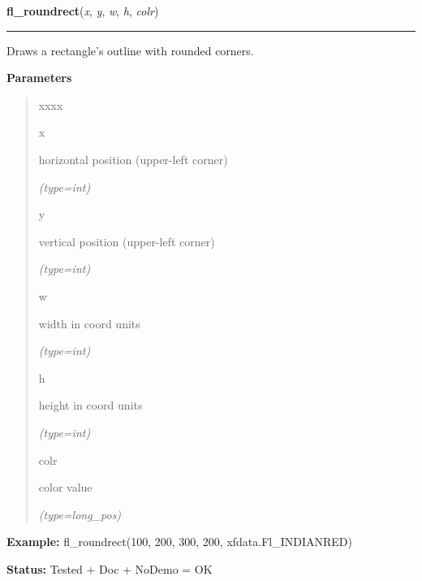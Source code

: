    \label{xformslib:flxbasic:fl_roundrect}

    \vspace{0.5ex}

\hspace{.8\funcindent}\begin{boxedminipage}{\funcwidth}

    \raggedright \textbf{fl\_roundrect}(\textit{x}, \textit{y}, \textit{w}, \textit{h}, \textit{colr})

    \vspace{-1.5ex}

    \rule{\textwidth}{0.5\fboxrule}
\setlength{\parskip}{2ex}
    Draws a rectangle's outline with rounded corners.

\setlength{\parskip}{1ex}
      \textbf{Parameters}
      \vspace{-1ex}

      \begin{quote}
        \begin{Ventry}{xxxx}

          \item[x]

          horizontal position (upper-left corner)

            {\it (type=int)}

          \item[y]

          vertical position (upper-left corner)

            {\it (type=int)}

          \item[w]

          width in coord units

            {\it (type=int)}

          \item[h]

          height in coord units

            {\it (type=int)}

          \item[colr]

          color value

            {\it (type=long\_pos)}

        \end{Ventry}

      \end{quote}

\textbf{Example:} fl\_roundrect(100, 200, 300, 200, xfdata.Fl\_INDIANRED)



\textbf{Status:} Tested + Doc + NoDemo = OK



    \end{boxedminipage}

